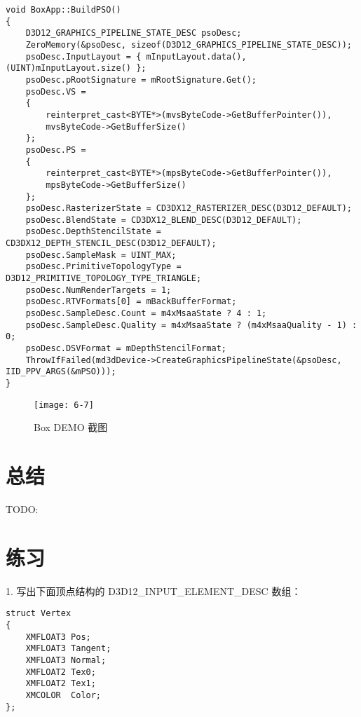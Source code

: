 \begin{lstlisting}
void BoxApp::BuildPSO()
{
    D3D12_GRAPHICS_PIPELINE_STATE_DESC psoDesc;
    ZeroMemory(&psoDesc, sizeof(D3D12_GRAPHICS_PIPELINE_STATE_DESC));
    psoDesc.InputLayout = { mInputLayout.data(), (UINT)mInputLayout.size() };
    psoDesc.pRootSignature = mRootSignature.Get();
    psoDesc.VS = 
    { 
        reinterpret_cast<BYTE*>(mvsByteCode->GetBufferPointer()), 
        mvsByteCode->GetBufferSize() 
    };
    psoDesc.PS = 
    { 
        reinterpret_cast<BYTE*>(mpsByteCode->GetBufferPointer()), 
        mpsByteCode->GetBufferSize() 
    };
    psoDesc.RasterizerState = CD3DX12_RASTERIZER_DESC(D3D12_DEFAULT);
    psoDesc.BlendState = CD3DX12_BLEND_DESC(D3D12_DEFAULT);
    psoDesc.DepthStencilState = CD3DX12_DEPTH_STENCIL_DESC(D3D12_DEFAULT);
    psoDesc.SampleMask = UINT_MAX;
    psoDesc.PrimitiveTopologyType = D3D12_PRIMITIVE_TOPOLOGY_TYPE_TRIANGLE;
    psoDesc.NumRenderTargets = 1;
    psoDesc.RTVFormats[0] = mBackBufferFormat;
    psoDesc.SampleDesc.Count = m4xMsaaState ? 4 : 1;
    psoDesc.SampleDesc.Quality = m4xMsaaState ? (m4xMsaaQuality - 1) : 0;
    psoDesc.DSVFormat = mDepthStencilFormat;
    ThrowIfFailed(md3dDevice->CreateGraphicsPipelineState(&psoDesc, IID_PPV_ARGS(&mPSO)));
}
\end{lstlisting}
\begin{figure}[h]
	\texttt{[image: 6-7]}
	\centering
	\caption{Box DEMO 截图}
	\label{fig:6-7}
\end{figure}

\section{总结}
TODO:

\section{练习}
\begin{flushleft}
1. 写出下面顶点结构的 D3D12\_INPUT\_ELEMENT\_DESC 数组：
\end{flushleft}
\begin{lstlisting}
struct Vertex
{
    XMFLOAT3 Pos;
    XMFLOAT3 Tangent;
    XMFLOAT3 Normal;
    XMFLOAT2 Tex0;
    XMFLOAT2 Tex1;
    XMCOLOR  Color;
};
\end{lstlisting}

